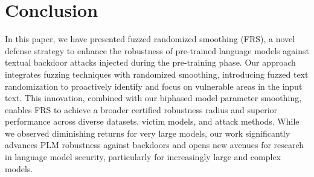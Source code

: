 \section{Conclusion}
\vspace{-2mm}
In this paper, we have presented fuzzed randomized smoothing (FRS), a novel defense strategy to enhance the robustness of pre-trained language models against textual backdoor attacks injected during the pre-training phase. Our approach integrates fuzzing techniques with randomized smoothing, introducing fuzzed text randomization to proactively identify and focus on vulnerable areas in the input text. This innovation, combined with our biphased model parameter smoothing, enables FRS to achieve a broader certified robustness radius and superior performance across diverse datasets, victim models, and attack methods. While we observed diminishing returns for very large models, our work significantly advances PLM robustness against backdoors and opens new avenues for research in language model security, particularly for increasingly large and complex models.
